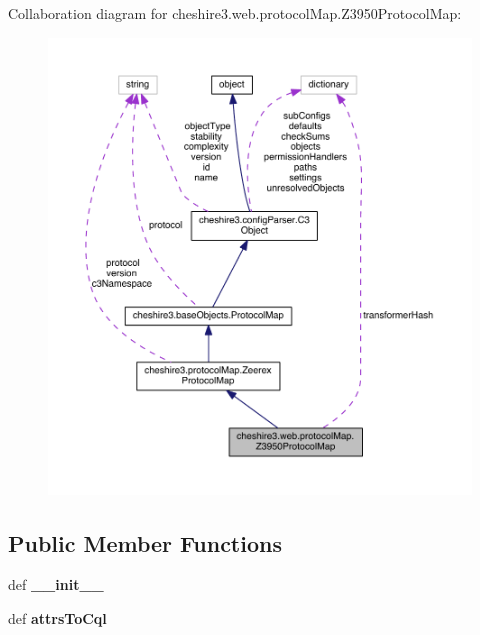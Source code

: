 Collaboration diagram for cheshire3.\-web.\-protocol\-Map.\-Z3950\-Protocol\-Map\-:
\nopagebreak
\begin{figure}[H]
\begin{center}
\leavevmode
\includegraphics[width=350pt]{classcheshire3_1_1web_1_1protocol_map_1_1_z3950_protocol_map__coll__graph}
\end{center}
\end{figure}
\subsection*{Public Member Functions}
\begin{DoxyCompactItemize}
\item 
\hypertarget{classcheshire3_1_1web_1_1protocol_map_1_1_z3950_protocol_map_a70f09e966a9004291adb55abd01b702d}{def {\bfseries \-\_\-\-\_\-init\-\_\-\-\_\-}}\label{classcheshire3_1_1web_1_1protocol_map_1_1_z3950_protocol_map_a70f09e966a9004291adb55abd01b702d}

\item 
\hypertarget{classcheshire3_1_1web_1_1protocol_map_1_1_z3950_protocol_map_accfebeff414285064bbd2464406b7900}{def {\bfseries attrs\-To\-Cql}}\label{classcheshire3_1_1web_1_1protocol_map_1_1_z3950_protocol_map_accfebeff414285064bbd2464406b7900}

\end{DoxyCompactItemize}
